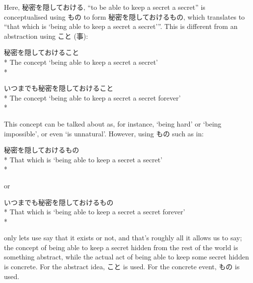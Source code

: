 \documentclass[11pt, b5paper, twoside, openright, onecolumn]{book}
\newenvironment{exampleblock}{
\setlength{\parindent}{0.6in}
\begin{minipage}[t]{\dimexpr\textwidth-\parindent}}
{\end{minipage}}
\begin{document}
Here‚ 秘密を隠しておける‚ “to be able to keep a secret a secret” is conceptualised using もの to form 秘密を隠しておけるもの‚ which translates to “that which is ‘being able to keep a secret a secret’”. This is different from an abstraction using こと (事):

\vspace{0.4cm}
\begin{exampleblock}
秘密を隠しておけること \\* 
The concept ‘being able to keep a secret a secret’ \\* 
\end{exampleblock}
\vspace{0.2cm}

\begin{exampleblock}
いつまでも秘密を隠しておけること \\* 
The concept ‘being able to keep a secret a secret forever’ \\* 
\end{exampleblock}
\vspace{0.2cm}

This concept can be talked about as‚ for instance‚ ‘being hard’ or ‘being impossible’‚ or even ‘is unnatural’. However‚ using もの such as in:

\vspace{0.4cm}
\begin{exampleblock}
秘密を隠しておけるもの \\* 
That which is ‘being able to keep a secret a secret’ \\* 
\end{exampleblock}
\vspace{0.2cm}

or

\vspace{0.4cm}
\begin{exampleblock}
いつまでも秘密を隠しておけるもの \\* 
That which is ‘being able to keep a secret a secret forever’ \\* 
\end{exampleblock}
\vspace{0.2cm}

only lets use say that it exists or not‚ and that’s roughly all it allows us to say; the concept of being able to keep a secret hidden from the rest of the world is something abstract‚ while the actual act of being able to keep some secret hidden is concrete. For the abstract idea‚ こと is used. For the concrete event‚ もの is used.
\end{document}
